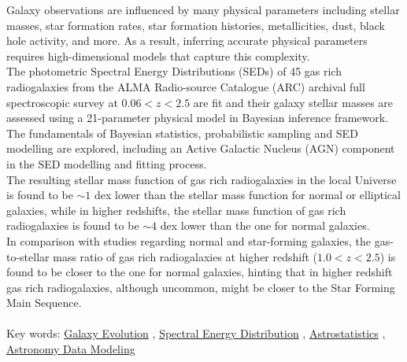 


Galaxy observations are influenced by many physical parameters including stellar masses, star formation rates, star formation histories, metallicities, dust, black hole activity, and more. As a result, inferring accurate physical parameters requires high-dimensional models that capture this complexity. \\
The photometric Spectral Energy Distributions (SEDs) of 45 gas rich radiogalaxies from the ALMA Radio-source Catalogue (ARC) archival full spectroscopic survey at $0.06<z<2.5$ are fit and their galaxy stellar masses are assessed using a 21-parameter physical model in Bayesian inference framework. The fundamentals of Bayesian statistics, probabilistic sampling and SED modelling are explored, including an Active Galactic Nucleus (AGN) component in the SED modelling and fitting process.\\
The resulting stellar mass function of gas rich radiogalaxies in the local Universe is found to be $\sim 1$ dex lower than the stellar mass function for normal or elliptical galaxies, while in higher redshifts, the stellar mass function of gas rich radiogalaxies is found to be $\sim 4$ dex lower than the one for normal galaxies. \\
In comparison with studies regarding normal and star-forming galaxies, the gas-to-stellar mass ratio of gas rich radiogalaxies at higher redshift ($1.0<z<2.5$) is found to be closer to the one for normal galaxies, hinting that in higher redshift gas rich radiogalaxies, although uncommon, might be closer to the Star Forming Main Sequence.\\ \\
Key words: \href{http://astrothesaurus.org/uat/594}{Galaxy Evolution} , \href{http://astrothesaurus.org/uat/2129}{Spectral Energy Distribution} , \href{http://astrothesaurus.org/uat/1882}{Astrostatistics} , \href{http://astrothesaurus.org/uat/1859}{Astronomy Data Modeling} 



